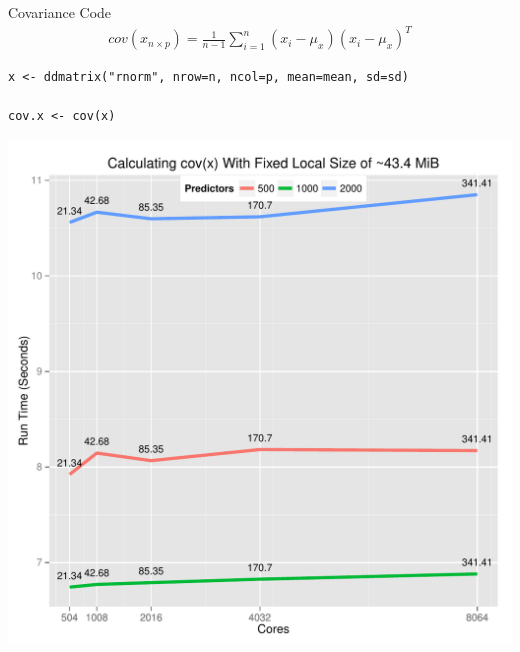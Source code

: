 \begin{frame}[fragile]
  \begin{block}{Covariance Code}
    \begin{align*}
    cov(x_{n\times p}) = 
\frac{1}{n-1}\sum_{i=1}^n\left(x_i-\mu_x\right)\left(x_i-\mu_x\right)^T
  \end{align*}
\begin{lstlisting}
x <- ddmatrix("rnorm", nrow=n, ncol=p, mean=mean, sd=sd)

cov.x <- cov(x)
\end{lstlisting}
  \end{block}
\end{frame}

\begin{frame}
  \begin{block}{}
  \begin{center}
    \includegraphics[height=.88\textheight]{../common/pics/cov}
  \end{center}
  \end{block}
\end{frame}


